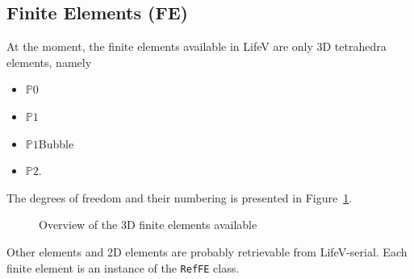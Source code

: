 \documentclass[11pt]{article}
\begin{document}
\subsection{Finite Elements (FE)}
\label{sec:FE}
At the moment, the finite elements available in LifeV are only 3D tetrahedra elements, namely
\begin{itemize}
\item $\mathbb{P}0$
\item $\mathbb{P}1$
\item $\mathbb{P}1$Bubble
\item $\mathbb{P}2$.
\end{itemize}
The degrees of freedom and their numbering is presented in Figure~\ref{fig:FE}.
\begin{figure}[H]
\begin{center}
\end{center}
\caption{Overview of the 3D finite elements available}
\label{fig:FE}
\end{figure}
Other elements and 2D elements are probably retrievable from LifeV-serial. Each finite element is an instance of the \texttt{RefFE} class.
\end{document}
